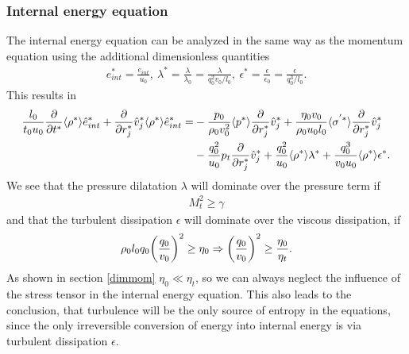 \subsubsection{Internal energy equation}
The internal energy equation can be analyzed in the same way as the momentum
equation using the additional dimensionless quantities
\begin{align}
e_{int}^*=\frac{e_{int}}{u_0},\ 
\lambda^* = \frac{\lambda}{\lambda_0} = \frac{\lambda}{q_0^2 v_0/l_0},\
\epsilon^* = \frac{\epsilon}{\epsilon_0} = \frac{\epsilon}{q_0^3 /l_0}.
\end{align}
This results in
\begin{align}
\begin{split}
\frac{l_0}{t_0 u_0}\frac{\partial}{\partial t^*}\langle \rho^* \rangle \hat{e}_{int}^*
+\frac{\partial}{\partial r_j^*}\hat{v}_j^* \langle \rho^* \rangle\hat{e}_{int}^* =&
-\frac{p_0}{\rho_0 v_0^2}\langle p^* \rangle\frac{\partial}{\partial r_j^*}\hat{v}_j^*
+\frac{\eta_0 v_0}{\rho_0 u_0 l_0}\langle \sigma^{'*} \rangle\frac{\partial}{\partial r_j^*}\hat{v}_j^*\\
&-\frac{q_0^2}{u_0} p_t\frac{\partial}{\partial r_j^*}\hat{v}_j^*
+\frac{q_0^2}{u_0}\langle \rho^* \rangle\lambda^*
+\frac{q_0^3}{v_0 u_0}\langle \rho^* \rangle\epsilon^*.
\end{split}
\end{align}
We see that the pressure dilatation $\lambda$ will dominate over the
pressure term if
\begin{align}
M_t^2 \geq \gamma
\end{align}
and that the turbulent dissipation $\epsilon$ will dominate over the viscous
dissipation, if 
\begin{align}
\rho_0 l_0 q_0 { \left( \frac{q_0}{v_0} \right) }^2 \geq \eta_0 \Rightarrow
{ \left( \frac{q_0}{v_0} \right) }^2 \geq \frac{\eta_0}{\eta_t}.
\end{align}
As shown in section \ref{dimmom} $\eta_0 \ll \eta_t$, so we can always neglect
the influence of the stress tensor in the internal energy equation. This also
leads to the conclusion, that turbulence will be the only source of entropy
in the equations, since the only irreversible conversion of energy into
internal energy is via turbulent dissipation $\epsilon$.

